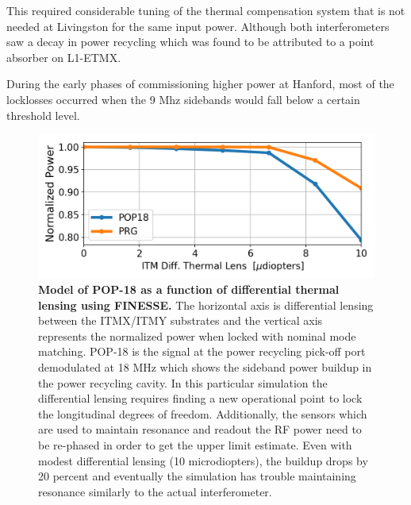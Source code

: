 	This required considerable tuning of the thermal compensation system that is not needed at Livingston for the same input power.  Although both interferometers saw a decay in power recycling which was found to be attributed to a point absorber on L1-ETMX.  
	
	During the early phases of commissioning higher power at Hanford, most of the locklosses occurred when the 9 Mhz sidebands would fall below a certain threshold level.

	\begin{figure}[t!]
		\centering
		\includegraphics[width=0.75 \textwidth]{../Figures/POP_18dive.png}
		\caption[Model of POP-18 as a function of differential thermal lensing using FINESSE.]  
		{\textbf{Model of POP-18 as a function of differential thermal lensing using FINESSE.}
			The horizontal axis is differential lensing between the ITMX/ITMY substrates and the vertical axis represents the normalized power when locked with nominal mode matching.  POP-18 is the signal at the power recycling pick-off port demodulated at 18 MHz which shows the sideband power buildup in the power recycling cavity. In this particular simulation the differential lensing requires finding a new operational point to lock the longitudinal degrees of freedom.  Additionally, the sensors which are used to maintain resonance and readout the RF power need to be re-phased in order to get the upper limit estimate.  Even with modest differential lensing (10 microdiopters), the buildup drops by 20 percent and eventually the simulation has trouble maintaining resonance similarly to the actual interferometer.
		}
		\label{fig:POP18}
	\end{figure}
	
